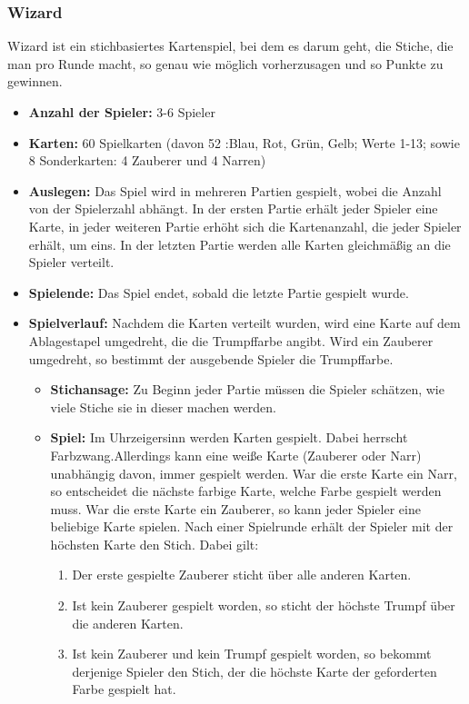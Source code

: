 \documentclass[titlepage,10pt,a4paper]{article}
\begin{document}
\subsubsection{Wizard}

Wizard ist ein stichbasiertes Kartenspiel, bei dem es darum geht, die Stiche, die man pro Runde macht, so genau wie möglich vorherzusagen und so Punkte zu gewinnen. 
\begin{itemize}
	\item \textbf{Anzahl der Spieler:} 3-6 Spieler
	\item \textbf{Karten:}  60 Spielkarten (davon 52 :Blau, Rot, Grün, Gelb; Werte 1-13; sowie 8 Sonderkarten: 4 Zauberer und 4 Narren)
	\item \textbf{Auslegen:} Das Spiel wird in mehreren Partien gespielt, wobei die Anzahl von der Spielerzahl abhängt. In der ersten Partie erhält jeder Spieler eine Karte, in jeder weiteren Partie erhöht sich die Kartenanzahl, die jeder Spieler erhält, um eins. In der letzten Partie werden alle Karten gleichmäßig an die Spieler verteilt.
	\item \textbf{Spielende:} Das Spiel endet, sobald die letzte Partie gespielt wurde.
	\item \textbf{Spielverlauf:} Nachdem die Karten verteilt wurden, wird eine Karte auf dem Ablagestapel umgedreht, die die \gls{Trumpf}farbe angibt. Wird ein Zauberer umgedreht, so bestimmt der ausgebende Spieler die \gls{Trumpf}farbe.
	\begin{itemize}
		\item \textbf{Stichansage:} Zu Beginn jeder Partie müssen die Spieler schätzen, wie viele Stiche sie in dieser machen werden.
		\item \textbf{Spiel:} Im Uhrzeigersinn werden Karten gespielt. Dabei herrscht \gls{Farbzwang}.Allerdings kann eine weiße Karte (Zauberer oder Narr) unabhängig davon, immer gespielt werden. War die erste Karte ein Narr, so entscheidet die nächste farbige Karte, welche Farbe gespielt werden muss. War die erste Karte ein Zauberer, so kann jeder Spieler eine beliebige Karte spielen. Nach einer \gls{Spielrunde} erhält der Spieler mit der höchsten Karte den Stich. Dabei gilt:
		\begin{enumerate}
			\item Der erste gespielte Zauberer sticht über alle anderen Karten.
			\item Ist kein Zauberer gespielt worden, so sticht der höchste \gls{Trumpf} über die anderen Karten.
			\item Ist kein Zauberer und kein \gls{Trumpf} gespielt worden, so bekommt derjenige Spieler den \gls{Stich}, der die höchste Karte der geforderten Farbe gespielt hat.

\end{enumerate}
\end{itemize}
\end{itemize}
\end{document}
